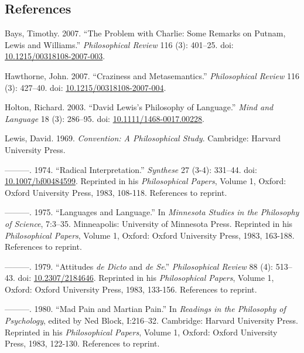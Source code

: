 \documentclass[
  11pt,
  letterpaper,
  DIV=11,
  numbers=noendperiod,
  twoside]{scrartcl}
\newlength{\cslhangindent}
\newenvironment{CSLReferences}[2] %
 {\begin{list}{}{%
  \setlength{\itemindent}{0pt}
  \setlength{\leftmargin}{0pt}
  \setlength{\parsep}{0pt}
  \ifodd #1
   \setlength{\leftmargin}{\cslhangindent}
   \setlength{\itemindent}{-1\cslhangindent}
  \fi
  \setlength{\itemsep}{#2\baselineskip}}}
 {\end{list}}
\begin{document}
\subsection*{References}\label{references}

\label{refs}
\begin{CSLReferences}{1}{0}
Bays, Timothy. 2007. {``The Problem with Charlie: Some Remarks on
Putnam, Lewis and Williams.''} \emph{Philosophical Review} 116 (3):
401--25. doi:
\href{https://doi.org/10.1215/00318108-2007-003}{10.1215/00318108-2007-003}.

Hawthorne, John. 2007. {``Craziness and Metasemantics.''}
\emph{Philosophical Review} 116 (3): 427--40. doi:
\href{https://doi.org/10.1215/00318108-2007-004}{10.1215/00318108-2007-004}.

Holton, Richard. 2003. {``David Lewis's Philosophy of Language.''}
\emph{Mind and Language} 18 (3): 286--95. doi:
\href{https://doi.org/10.1111/1468-0017.00228}{10.1111/1468-0017.00228}.

Lewis, David. 1969. \emph{Convention: A Philosophical Study}. Cambridge:
Harvard University Press.

---------. 1974. {``Radical Interpretation.''} \emph{Synthese} 27 (3-4):
331--44. doi:
\href{https://doi.org/10.1007/bf00484599}{10.1007/bf00484599}. Reprinted
in his \emph{Philosophical Papers}, Volume 1, Oxford: Oxford University
Press, 1983, 108-118. References to reprint.

---------. 1975. {``Languages and Language.''} In \emph{Minnesota
Studies in the Philosophy of Science}, 7:3--35. Minneapolis: University
of Minnesota Press. Reprinted in his \emph{Philosophical Papers}, Volume
1, Oxford: Oxford University Press, 1983, 163-188. References to
reprint.

---------. 1979. {``Attitudes \emph{de Dicto} and \emph{de Se}.''}
\emph{Philosophical Review} 88 (4): 513--43. doi:
\href{https://doi.org/10.2307/2184646}{10.2307/2184646}. Reprinted in
his \emph{Philosophical Papers}, Volume 1, Oxford: Oxford University
Press, 1983, 133-156. References to reprint.

---------. 1980. {``Mad Pain and Martian Pain.''} In \emph{Readings in
the Philosophy of Psychology}, edited by Ned Block, I:216--32.
Cambridge: Harvard University Press. Reprinted in his
\emph{Philosophical Papers}, Volume 1, Oxford: Oxford University Press,
1983, 122-130. References to reprint.


\end{CSLReferences}
\end{document}
